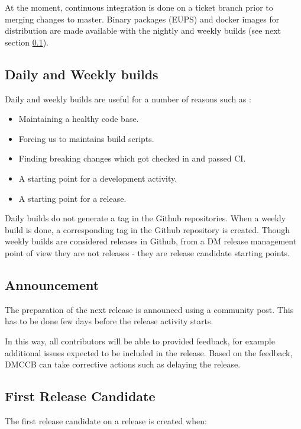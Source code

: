 At the moment, continuous integration is done on a ticket branch prior to merging changes to master. Binary packages (EUPS) and docker images for distribution are made available with the nightly and weekly builds (see next section \ref{sec:weekly}).


\subsection{Daily and Weekly builds} \label{sec:weekly}

Daily and weekly builds are  useful for a number of reasons such as :
\begin{itemize}
	\item Maintaining a healthy code base.
	\item Forcing us to maintains build scripts.
	\item Finding breaking changes which got checked in and passed CI.
	\item A starting point for a development activity.
	\item A starting point for a release.
\end{itemize}

Daily builds do not generate a tag in the Github repositories.
When a weekly build is done, a corresponding tag in the Github repository is created.
Though weekly builds are considered releases in Github, from a DM release management point of view they are not
releases - they are release candidate starting points.


\subsection{Announcement} \label{sec:anaouncement}

The preparation of the next release is announced using a community post.
This has to be done few days before the release activity starts.

In this way, all contributors will be able to provided feedback, for example additional issues expected to be included in the release.
Based on the feedback, DMCCB can take corrective actions such as delaying the release.


\subsection{First Release Candidate} \label{sec:firstrc}

The first release candidate on a release is created when:

